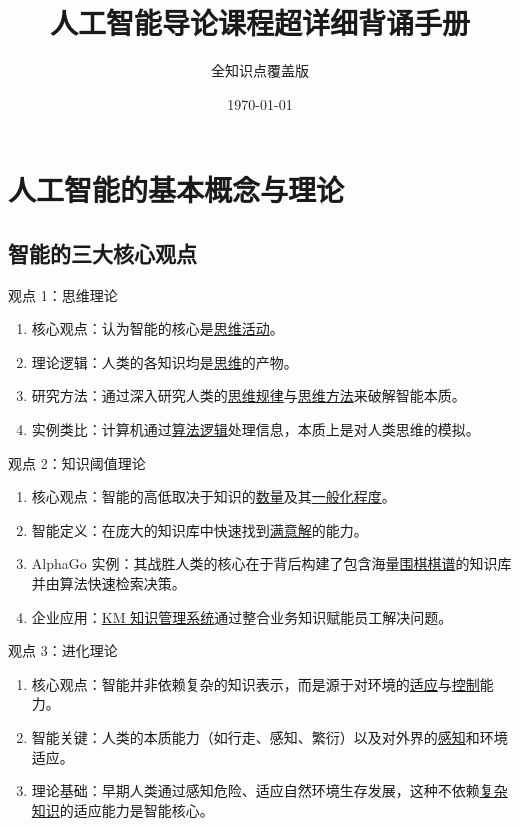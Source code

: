 \documentclass[11pt,a4paper]{ctexrep}
\title{\Huge 人工智能导论课程超详细背诵手册}
\author{全知识点覆盖版}
\date{\today}
\newcommand{\fillblank}[1]{\underline{\hspace{2em}#1\hspace{2em}}}
\begin{document}
\maketitle
\tableofcontents

\chapter{人工智能的基本概念与理论}

\section{智能的三大核心观点}

\begin{qbox}{观点 1：思维理论}
    \begin{enumerate}
        \item 核心观点：认为智能的核心是\fillblank{思维活动}。
        \item 理论逻辑：人类的各知识均是\fillblank{思维}的产物。
        \item 研究方法：通过深入研究人类的\fillblank{思维规律}与\fillblank{思维方法}来破解智能本质。
        \item 实例类比：计算机通过\fillblank{算法逻辑}处理信息，本质上是对人类思维的模拟。
    \end{enumerate}
\end{qbox}

\begin{qbox}{观点 2：知识阈值理论}
    \begin{enumerate}
        \item 核心观点：智能的高低取决于知识的\fillblank{数量}及其\fillblank{一般化程度}。
        \item 智能定义：在庞大的知识库中快速找到\fillblank{满意解}的能力。
        \item AlphaGo 实例：其战胜人类的核心在于背后构建了包含海量\fillblank{围棋棋谱}的知识库并由算法快速检索决策。
        \item 企业应用：\fillblank{KM 知识管理系统}通过整合业务知识赋能员工解决问题。
    \end{enumerate}
\end{qbox}

\begin{qbox}{观点 3：进化理论}
    \begin{enumerate}
        \item 核心观点：智能并非依赖复杂的知识表示，而是源于对环境的\fillblank{适应}与\fillblank{控制}能力。
        \item 智能关键：人类的本质能力（如行走、感知、繁衍）以及对外界的\fillblank{感知}和环境适应。
        \item 理论基础：早期人类通过感知危险、适应自然环境生存发展，这种不依赖\fillblank{复杂知识}的适应能力是智能核心。
    \end{enumerate}
\end{qbox}
\end{document}
